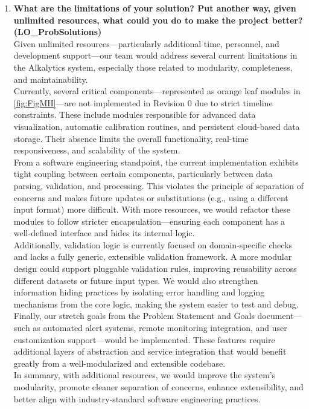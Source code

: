 \documentclass[12pt, titlepage]{article}
\begin{document}
\begin{enumerate}
  \item \textbf{What are the limitations of your solution?  Put another way, given
  unlimited resources, what could you do to make the project better? (LO\_ProbSolutions)}\\
  \newline
  Given unlimited resources—particularly additional time, personnel, and development support—our team would address several current 
  limitations in the Alkalytics system, especially those related to modularity, completeness, and maintainability.\\
  \newline
  Currently, several critical components—represented as orange leaf modules in \ref{fig:FigMH}—are not implemented in Revision 0 due 
  to strict timeline constraints. These include modules responsible for advanced data visualization, automatic calibration routines, 
  and persistent cloud-based data storage. Their absence limits the overall functionality, real-time responsiveness, and scalability of 
  the system.\\
  \newline
  From a software engineering standpoint, the current implementation exhibits tight coupling between certain components, particularly 
  between data parsing, validation, and processing. This violates the principle of separation of concerns and makes future updates or 
  substitutions (e.g., using a different input format) more difficult. With more resources, we would refactor these modules to follow 
  stricter encapsulation—ensuring each component has a well-defined interface and hides its internal logic.\\
  \newline
  Additionally, validation logic is currently focused on domain-specific checks and lacks a fully generic, extensible validation framework.
  A more modular design could support pluggable validation rules, improving reusability across different datasets or future input types. 
  We would also strengthen information hiding practices by isolating error handling and logging mechanisms from the core logic, making the 
  system easier to test and debug.\\
  \newline
  Finally, our stretch goals from the Problem Statement and Goals document—such as automated alert systems, remote monitoring integration, 
  and user customization support—would be implemented. These features require additional layers of abstraction and service integration that 
  would benefit greatly from a well-modularized and extensible codebase.\\
  \newline
  In summary, with additional resources, we would improve the system's modularity, promote cleaner separation of concerns, enhance 
  extensibility, and better align with industry-standard software engineering practices.\\


\end{enumerate}
\end{document}
